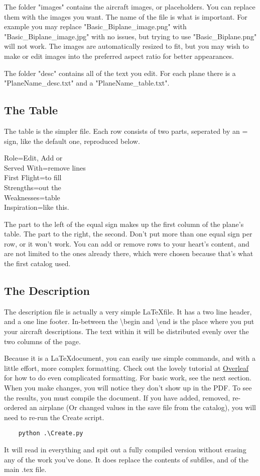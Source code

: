 \documentclass{article}
\begin{document}
The folder "images" contains the aircraft images, or placeholders.  You can replace them with the images you want.  The name of the file is what is important.  For example you may replace "Basic\_Biplane\_image.png" with "Basic\_Biplane\_image.jpg" with no issues, but trying to use "Basic\_Biplane.png" will not work.  The images are automatically resized to fit, but you may wish to make or edit images into the preferred aspect ratio for better appearances.

The folder "desc" contains all of the text you edit.  For each plane there is a "PlaneName\_desc.txt" and a "PlaneName\_table.txt".

\subsection{The Table}
The table is the simpler file.  Each row consists of two parts, seperated by an = sign, like the default one, reproduced below.
\begin{displayquote}
    Role=Edit, Add or\\
    Served With=remove lines\\
    First Flight=to fill\\
    Strengths=out the\\
    Weaknesses=table\\
    Inspiration=like this.\\
\end{displayquote}
The part to the left of the equal sign makes up the first column of the plane's table.  The part to the right, the second.  Don't put more than one equal sign per row, or it won't work.  You can add or remove rows to your heart's content, and are not limited to the ones already there, which were chosen because that's what the first catalog used.

\subsection{The Description}
The description file is actually a very simple \LaTeX file.  It has a two line header, and a one line footer.  In-between the \textbackslash begin and \textbackslash end is the place where you put your aircraft descriptions.  The text within it will be distributed evenly over the two columns of the page.

Because it is a \LaTeX document, you can easily use simple commands, and with a little effort, more complex formatting.  Check out the lovely tutorial at \href{https://overleaf.com/learn/latex/Paragraphs_and_new_lines}{\color{blue}\underline{Overleaf}} for how to do even complicated formatting.  For basic work, see the next section.
When you make changes, you will notice they don't show up in the PDF.  To see the results, you must compile the document.  If you have added, removed, re-ordered an airplane (Or changed values in the save file from the catalog), you will need to re-run the Create script.
\begin{verbatim}
    python .\Create.py
\end{verbatim}
It will read in everything and spit out a fully compiled version without erasing any of the work you've done.  It does replace the contents of subfiles, and of the main .tex file.
\end{document}
